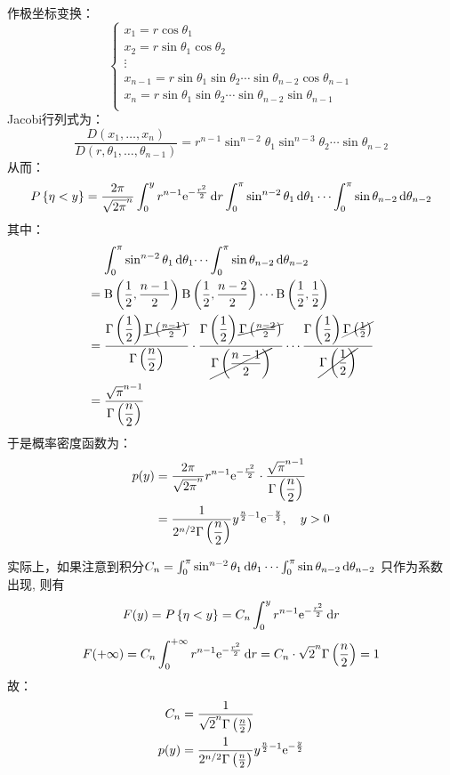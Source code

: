 作极坐标变换：
\[
    \begin{cases}
        x_{1} = r \cos \theta_{1} \\
        x_{2} = r \sin \theta_{1} \cos \theta_{2} \\
        \vdots\\
        x_{n-1} = r \sin \theta_{1} \sin \theta_{2} \cdots
        \sin\theta_{n-2} \cos\theta_{n-1}\\
        x_{n} = r \sin\theta_{1} \sin\theta_{2} \cdots
        \sin\theta_{n-2} \sin\theta_{n-1}\\
    \end{cases}
\]
Jacobi行列式为：
\[
    \frac{D(x_{1},\dots ,x_{n})}{D(r,\theta_{1},\dots,
    \theta_{n-1})} = r^{n-1} \sin^{n-2} \theta_{1}
    \sin^{n-3} \theta_{2} \cdots \sin\theta_{n-2}
\]
从而：
\[
    \P{\eta<y} = \frac{2\pi}{\sqrt{2\pi}^{n}}
    \int_{0}^{y} r^{n-1} \e^{-\frac{r^{2}}{2}} \d{r}
    \int_{0}^{\pi} \sin^{n-2} \theta_{1} \d{\theta_{1}} \cdots
    \int_{0}^{\pi} \sin\theta_{n-2} \d{\theta_{n-2}}
\]
其中：
\begin{align*}
    &\placeholder{=}\int_{0}^{\pi} \sin^{n-2} \theta_{1}
    \d{\theta_{1}} \dots
    \int_{0}^{\pi} \sin\theta_{n-2} \d{\theta_{n-2}}\\
    &= \betafunc{\frac{1}{2}}{\frac{n-1}{2}}
    \betafunc{\frac{1}{2}}{\frac{n-2}{2}} \cdots
    \betafunc{\frac{1}{2}}{\frac{1}{2}}\\
    &=
    \frac{\gammfunc{\dfrac{1}{2}}
    \cancel{\gammfunc{\frac{n-1}{2}}}}{\gammfunc{\dfrac{n}{2}}} \cdot
    \frac{\gammfunc{\dfrac{1}{2}}
    \cancel{\gammfunc{\frac{n-2}{2}}}}{\cancel{\gammfunc{\dfrac{n-1}{2}}}}
    \cdots
    \frac{\gammfunc{\dfrac{1}{2}}
    \cancel{\gammfunc{\frac{1}{2}}}}{\cancel{\gammfunc{\dfrac{1}{2}}}}\\
    &= \frac{\sqrt{\pi}^{n-1} }{\gammfunc{\dfrac{n}{2}}}
\end{align*}
于是概率密度函数为：
\begin{align*}
    p(y) &= \frac{2\pi}{\sqrt{2\pi}^{n}} r^{n-1} \mathrm{e}^{-\frac{r^{2}}{2}}
    \cdot \frac{\sqrt{\pi}^{n-1} }{\Gamma\left(\dfrac{n}{2}\right)}\\
    &= \frac{1}{2^{n/2} \Gamma\left(\dfrac{n}{2}\right)}
    y^{\frac{n}{2}-1} \mathrm{e}^{-\frac{y}{2}}, \quad y>0
\end{align*}

实际上，如果注意到积分\(C_{n}=\int_{0}^{\pi} \sin^{n-2} \theta_{1}
    \d{\theta_{1}} \cdots
\int_{0}^{\pi} \sin\theta_{n-2} \d{\theta_{n-2}}\)
只作为系数出现, 则有\[
    F(y)=\P{\eta<y} = C_{n} \int_{0}^{y} r^{n-1}
    \e^{-\frac{r^{2}}{2}} \d{r}
\]
\[
    F(+\infty) = C_{n} \int_{0}^{+\infty} r^{n-1}
    \e^{-\frac{r^{2}}{2}} \d{r} = C_{n} \cdot \sqrt{2}^{n}
    \gammfunc{\frac{n}{2}} = 1
\]
故：
\begin{align*}
    C_{n} &= \frac{1}{\sqrt{2}^{n} \Gamma\left(\frac{n}{2}\right)}\\
    p(y) &= \frac{1}{2^{n/2} \Gamma\left(\frac{n}{2}\right)} y^{\frac{n}{2}-1}
    \mathrm{e}^{-\frac{y}{2}}
\end{align*}

